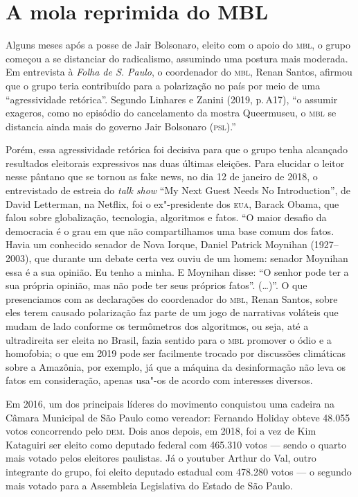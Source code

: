 \section{A mola reprimida do MBL}

Alguns meses após a posse de Jair Bolsonaro, eleito com o apoio do \textsc{mbl},
o grupo começou a se distanciar do radicalismo, assumindo uma postura
mais moderada. Em entrevista à \emph{Folha de S. Paulo}, o coordenador
do \textsc{mbl}, Renan Santos, afirmou que o grupo teria contribuído para a
polarização no país por meio de uma ``agressividade retórica''. Segundo
Linhares e Zanini (2019, p.\,A17), ``o assumir exageros, como no episódio
do cancelamento da mostra Queermuseu, o \textsc{mbl} se distancia ainda mais do
governo Jair Bolsonaro (\textsc{psl}).''

Porém, essa agressividade retórica foi decisiva para que o grupo tenha
alcançado resultados eleitorais expressivos nas duas últimas eleições.
Para elucidar o leitor nesse pântano que se tornou as fake news, no dia
12 de janeiro de 2018, o entrevistado de estreia do \emph{talk show} ``My Next
Guest Needs No Introduction'', de David Letterman, na Netflix, foi o
ex"-presidente dos \textsc{eua}, Barack Obama, que falou sobre globalização,
tecnologia, algoritmos e fatos. ``O maior desafio da democracia é o grau
em que não compartilhamos uma base comum dos fatos. Havia um conhecido
senador de Nova Iorque, Daniel Patrick Moynihan (1927--2003), que durante
um debate certa vez ouviu de um homem: senador Moynihan essa é a sua
opinião. Eu tenho a minha. E Moynihan disse: ``O senhor pode ter a sua
própria opinião, mas não pode ter seus próprios fatos''. (\ldots{})''. O que
presenciamos com as declarações do coordenador do \textsc{mbl}, Renan Santos,
sobre eles terem causado polarização faz parte de um jogo de narrativas
voláteis que mudam de lado conforme os termômetros dos algoritmos, ou
seja, até a ultradireita ser eleita no Brasil, fazia sentido para o \textsc{mbl}
promover o ódio e a homofobia; o que em 2019 pode ser facilmente trocado
por discussões climáticas sobre a Amazônia, por exemplo, já que a
máquina da desinformação não leva os fatos em consideração, apenas
usa"-os de acordo com interesses diversos.

Em 2016, um dos principais líderes do movimento conquistou uma cadeira
na Câmara Municipal de São Paulo como vereador: Fernando Holiday obteve
48.055 votos concorrendo pelo \textsc{dem}. Dois anos depois, em 2018, foi a vez
de Kim Kataguiri ser eleito como deputado federal com 465.310 votos ---
sendo o quarto mais votado pelos eleitores paulistas. Já o youtuber
Arthur do Val, outro integrante do grupo, foi eleito deputado estadual
com 478.280 votos --- o segundo mais votado para a Assembleia Legislativa
do Estado de São Paulo.

